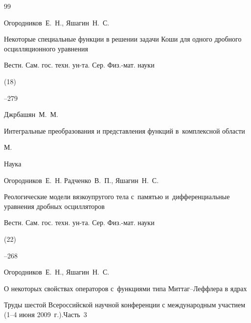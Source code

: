 \begin{thebibliography}{99}

\by Огородников~Е.~Н., Яшагин~Н.~С.

\paper Некоторые специальные функции в решении задачи Коши для одного дробного осцилляционного уравнения

\jour Вестн. Сам. гос. техн. ун-та. Сер. Физ.-мат. науки


(18)

--279








\by Джрбашян~М.~М.

\book Интегральные преобразования и представления функций в~комплексной области

\publaddr М.

\publ Наука









\by Огородников~Е.~Н. Радченко~В.~П., Яшагин~Н.~С.

\paper Реологические модели вязкоупругого тела с~памятью и~дифференциальные уравнения дробных осцилляторов

\jour Вестн. Сам. гос. техн. ун-та. Сер. Физ.-мат. науки


(22)

--268








\by Огородников~Е.~Н., Яшагин~Н.~С.

\paper О некоторых свойствах операторов с~функциями типа Миттаг--Леффлера в ядрах

\inbook Труды шестой Всероссийской научной конференции с международным участием  \rm  (1--4 июня 2009~г.).Часть~3


\end{thebibliography}
